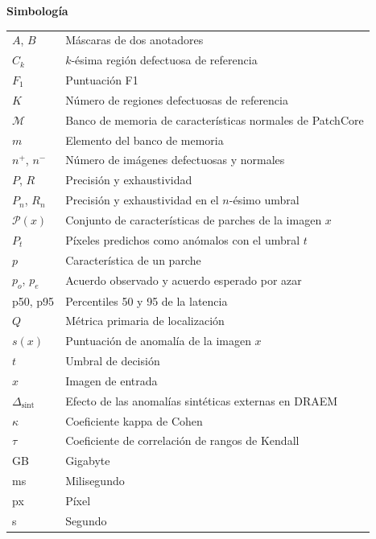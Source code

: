 \documentclass[12pt,oneside]{report}
\begin{document}
\clearpage
{}
{\centering\textbf{Simbología}\par}
\begingroup\singlespacing\renewcommand{\arraystretch}{1.25}
\noindent\begin{tabular}{@{}p{3cm}p{12cm}}
$A$, $B$ & Máscaras de dos anotadores \\
$C_k$ & $k$-ésima región defectuosa de referencia \\
$F_1$ & Puntuación F1 \\
$K$ & Número de regiones defectuosas de referencia \\
$\mathcal{M}$ & Banco de memoria de características normales de PatchCore \\
$m$ & Elemento del banco de memoria \\
$n^{+}$, $n^{-}$ & Número de imágenes defectuosas y normales \\
$P$, $R$ & Precisión y exhaustividad \\
$P_n$, $R_n$ & Precisión y exhaustividad en el $n$-ésimo umbral \\
$\mathcal{P}(x)$ & Conjunto de características de parches de la imagen $x$ \\
$P_t$ & Píxeles predichos como anómalos con el umbral $t$ \\
$p$ & Característica de un parche \\
$p_o$, $p_e$ & Acuerdo observado y acuerdo esperado por azar \\
p50, p95 & Percentiles 50 y 95 de la latencia \\
$Q$ & Métrica primaria de localización \\
$s(x)$ & Puntuación de anomalía de la imagen $x$ \\
$t$ & Umbral de decisión \\
$x$ & Imagen de entrada \\
$\Delta_{\mathrm{sint}}$ & Efecto de las anomalías sintéticas externas en DRAEM \\
$\kappa$ & Coeficiente kappa de Cohen \\
$\tau$ & Coeficiente de correlación de rangos de Kendall \\
GB & Gigabyte \\
ms & Milisegundo \\
px & Píxel \\
s & Segundo \\
\end{tabular}
\endgroup
\end{document}
